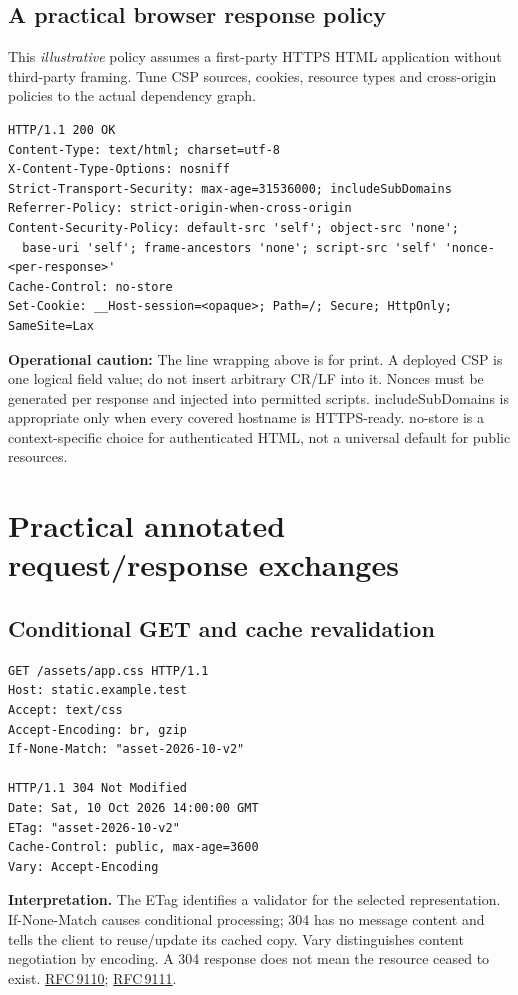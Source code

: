 \documentclass[10pt,letterpaper,oneside]{article}
\newcommand{\field}[1]{{\ttfamily\small\color{Deep}#1}}
\newcommand{\rf}[1]{\href{https://www.rfc-editor.org/rfc/rfc#1.html}{RFC\,#1}}
\begin{document}
\subsection{A practical browser response policy}
This \emph{illustrative} policy assumes a first-party HTTPS HTML application without third-party framing. Tune CSP sources, cookies, resource types and cross-origin policies to the actual dependency graph.
\begin{lstlisting}
HTTP/1.1 200 OK
Content-Type: text/html; charset=utf-8
X-Content-Type-Options: nosniff
Strict-Transport-Security: max-age=31536000; includeSubDomains
Referrer-Policy: strict-origin-when-cross-origin
Content-Security-Policy: default-src 'self'; object-src 'none'; 
  base-uri 'self'; frame-ancestors 'none'; script-src 'self' 'nonce-<per-response>'
Cache-Control: no-store
Set-Cookie: __Host-session=<opaque>; Path=/; Secure; HttpOnly; SameSite=Lax
\end{lstlisting}
\textbf{Operational caution:} The line wrapping above is for print. A deployed CSP is one logical field value; do not insert arbitrary CR/LF into it. Nonces must be generated per response and injected into permitted scripts. \field{includeSubDomains} is appropriate only when every covered hostname is HTTPS-ready. \field{no-store} is a context-specific choice for authenticated HTML, not a universal default for public resources.

\section{Practical annotated request/response exchanges}
\subsection{Conditional GET and cache revalidation}
\begin{lstlisting}
GET /assets/app.css HTTP/1.1
Host: static.example.test
Accept: text/css
Accept-Encoding: br, gzip
If-None-Match: "asset-2026-10-v2"

HTTP/1.1 304 Not Modified
Date: Sat, 10 Oct 2026 14:00:00 GMT
ETag: "asset-2026-10-v2"
Cache-Control: public, max-age=3600
Vary: Accept-Encoding
\end{lstlisting}
\textbf{Interpretation.} The \field{ETag} identifies a validator for the selected representation. \field{If-None-Match} causes conditional processing; 304 has no message content and tells the client to reuse/update its cached copy. \field{Vary} distinguishes content negotiation by encoding. A 304 response does not mean the resource ceased to exist. \rf{9110}; \rf{9111}.
\end{document}
